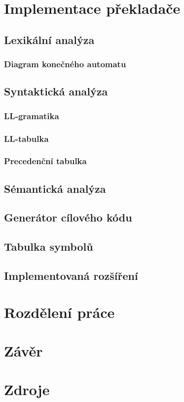 \documentclass[11pt,a4paper]{article}
\begin{document}
\section{Implementace překladače}
    \subsection{Lexikální analýza}
        \subsubsection{Diagram konečného automatu}
    \subsection{Syntaktická analýza}
        \subsubsection{LL-gramatika}
        \subsubsection{LL-tabulka}
        \subsubsection{Precedenční tabulka}
    \subsection{Sémantická analýza}
    \subsection{Generátor cílového kódu}
    \subsection{Tabulka symbolů}
    \subsection{Implementovaná rozšíření}
\section{Rozdělení práce}
\section{Závěr}

\newpage

\section{Zdroje}
    
    
\end{document}
